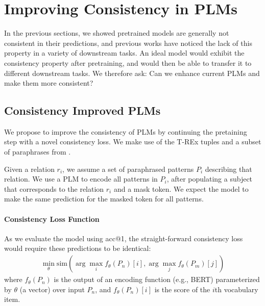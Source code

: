 \section{Improving Consistency in PLMs}
\label{sec:adding_consistency}

In the previous sections, we showed pretrained models are generally not consistent in their predictions, and previous works have noticed the lack of this property in a variety of downstream tasks.
An ideal model would exhibit the consistency property after pretraining, and would then be able to transfer it to different downstream tasks. We therefore ask:
Can we enhance current PLMs and make them more consistent?

\subsection{Consistency Improved PLMs}
We propose to improve the consistency of PLMs by continuing the pretaining step with a novel consistency loss. %
We make use of the T-REx tuples and a subset of paraphrases from \resource{}.

Given a relation $r_i$, we
assume a set of paraphrased patterns $P_i$ describing that relation.
We use a PLM to encode all patterns in $P_i$, after
populating a subject  that corresponds to the relation $r_i$
and a mask token. We expect the model to make the same
prediction for the masked token for all patterns.


\paragraph{Consistency Loss Function}
As we evaluate the model using acc@1, the straight-forward consistency loss would require these predictions to be identical:
\begin{gather*} 
\min_{\theta} \mbox{sim}(\arg\max_i f_\theta(P_n)[i], \arg\max_j f_\theta(P_m)[j])%
\end{gather*}
where $f_\theta(P_n)$ is the output of an encoding function (e.g., BERT) parameterized by $\theta$ (a vector) over input $P_n$, and $f_\theta(P_n)[i]$ is the score of the $i$th vocabulary item.

